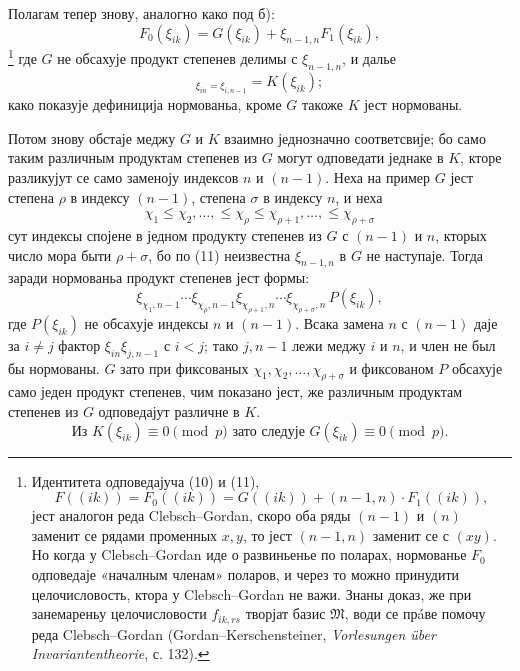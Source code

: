﻿\documentclass[11pt]{article}
\providecommand{\frM}{\mathfrak M}
\begin{document}
Полагам тепер знову, аналогно како под б):
\begin{equation}
        F_0(\xi_{ik})=G(\xi_{ik})+\xi_{n-1,n}F_1(\xi_{ik}),
\end{equation}
\footnote{Идентитета одповедајуча (10) и (11),
        \[
          F((ik))=F_0((ik))=G((ik))+(n-1,n)\cdot F_1((ik)),
        \]
        јест аналогон реда Clebsch--Gordan, скоро оба ряды \((n-1)\) и \((n)\) заменит се рядами променных \(x,y\), то јест \((n-1,n)\) заменит се с \((xy)\). Но когда у Clebsch--Gordan иде о развиньенье по поларах, нормованье \(F_0\) одповедаје «началным членам» поларов, и через то можно принудити целочисловость, ктора у Clebsch--Gordan не важи. Знаны доказ, же при занемареньу целочисловости \(f_{ik,rs}\) творјат базис \(\frM\), води се прáве помочу реда Clebsch--Gordan (Gordan--Kerschensteiner, \emph{Vorlesungen über Invariantentheorie}, с. 132).}
где \(G\) не обсахује продукт степенев делимы с \(\xi_{n-1,n}\), и далье
\begin{equation}
        [G]_{\xi_{in}=\xi_{i,n-1}}=K(\xi_{ik});
\end{equation}
како показује дефиниција нормованьа, кроме \(G\) такоже \(K\) јест нормованы.

Потом знову обстаје меджу \(G\) и \(K\) взаимно једнозначно соответсвије; бо само таким различным продуктам степенев из \(G\) могут одповедати једнаке в \(K\), кторе разликујут се само заменоју индексов \(n\) и \((n-1)\). Неха на пример \(G\) јест степена \(\rho\) в индексу \((n-1)\), степена \(\sigma\) в индексу \(n\), и неха
\[
        \chi_1\le\chi_2,\ldots,\le\chi_\rho\le\chi_{\rho+1},\ldots,\le\chi_{\rho+\sigma}
\]
сут индексы спојене в једном продукту степенев из \(G\) с \((n-1)\) и \(n\), кторых число мора быти \(\rho+\sigma\), бо по (11) неизвестна \(\xi_{n-1,n}\) в \(G\) не наступаје. Тогда заради нормованьа продукт степенев јест формы:
\[
        \xi_{\chi_1,n-1}\cdots\xi_{\chi_\rho,n-1}
        \xi_{\chi_{\rho+1},n}\cdots\xi_{\chi_{\rho+\sigma},n}\,P(\xi_{ik}),
\]
где \(P(\xi_{ik})\) не обсахује индексы \(n\) и \((n-1)\). Всака замена \(n\) с \((n-1)\) даје за \(i\ne j\) фактор \(\xi_{in}\xi_{j,n-1}\) с \(i<j\); тако \(j,n-1\) лежи меджу \(i\) и \(n\), и член не был бы нормованы. \(G\) зато при фиксованых \(\chi_1,\chi_2,\ldots,\chi_{\rho+\sigma}\) и фиксованом \(P\) обсахује само једен продукт степенев, чим показано јест, же различным продуктам степенев из \(G\) одповедајут различне в \(K\).
\begin{equation}
        \text{Из }K(\xi_{ik})\equiv0\pmod p\text{ зато следује }G(\xi_{ik})\equiv0\pmod p.
\end{equation}
\end{document}

